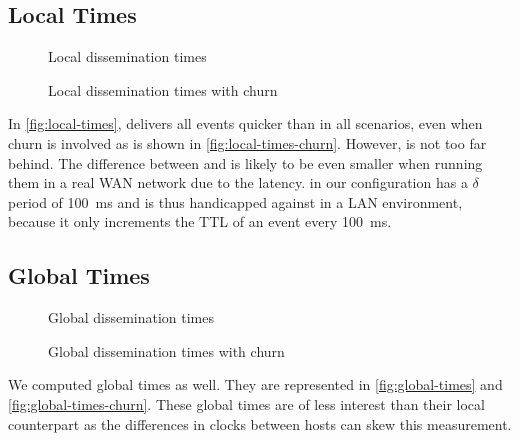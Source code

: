 \subsection{Local Times}
\label{sub:local-times}
\begin{figure*}[hpt]
	\centering
	
	\vspace{-2mm} 
	\caption{Local dissemination times}
	\vspace{-2mm}
	\label{fig:local-times} 
\end{figure*}

\begin{figure}[hpt]
	\centering
	
	\vspace{-2mm} 
	\caption{Local dissemination times with churn}
	\vspace{-2mm} 
	\label{fig:local-times-churn} 
\end{figure}
In \autoref{fig:local-times}, \jgroups delivers all events quicker than \epto in all scenarios, even when churn is involved as is shown in \autoref{fig:local-times-churn}. However, \epto is not too far behind. The difference between \epto and \jgroups is likely to be even smaller when running them in a real WAN network due to the latency. \epto in our configuration has a $\delta$ period of \SI{100}{\milli\second} and is thus handicapped against \jgroups in a LAN environment, because it only increments the TTL of an event every \SI{100}{\milli\second}.
\subsection{Global Times}
\begin{figure*}[hpt]
	\centering
	
	\vspace{-2mm} 
	\caption{Global dissemination times}
	\vspace{-2mm}
	\label{fig:global-times}  
\end{figure*}

\begin{figure}[hpt]
	\centering
	
	\vspace{-2mm} 
	\caption{Global dissemination times with churn}
	\vspace{-2mm} 
	\label{fig:global-times-churn} 
\end{figure}
We computed global times as well. They are represented in \autoref{fig:global-times} and \autoref{fig:global-times-churn}. These global times are of less interest than their local counterpart as the differences in clocks between hosts can skew this measurement.


